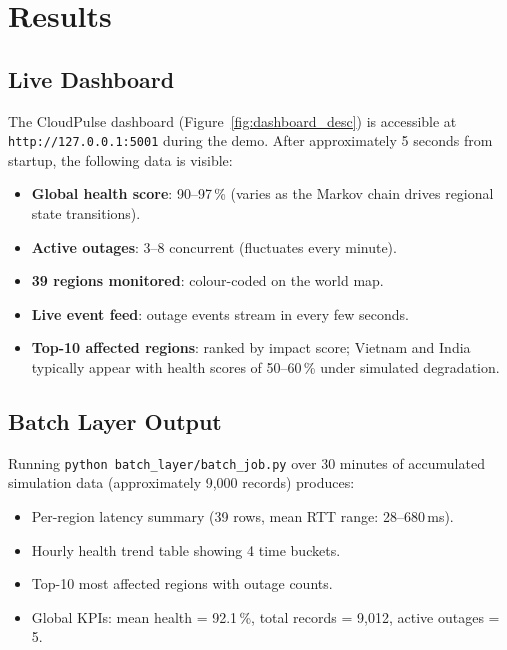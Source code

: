 \documentclass[conference]{IEEEtran}
\begin{document}
\section{Results}

\subsection{Live Dashboard}

The CloudPulse dashboard (Figure~\ref{fig:dashboard_desc}) is accessible at
\texttt{http://127.0.0.1:5001} during the demo. After approximately 5 seconds
from startup, the following data is visible:

\begin{itemize}
  \item \textbf{Global health score}: 90--97\,\% (varies as the Markov chain
    drives regional state transitions).
  \item \textbf{Active outages}: 3--8 concurrent (fluctuates every minute).
  \item \textbf{39 regions monitored}: colour-coded on the world map.
  \item \textbf{Live event feed}: outage events stream in every few seconds.
  \item \textbf{Top-10 affected regions}: ranked by impact score; Vietnam and
    India typically appear with health scores of 50--60\,\% under simulated
    degradation.
\end{itemize}

\subsection{Batch Layer Output}

Running \texttt{python batch\_layer/batch\_job.py} over 30 minutes of accumulated
simulation data (approximately 9{,}000 records) produces:
\begin{itemize}
  \item Per-region latency summary (39 rows, mean RTT range: 28--680\,ms).
  \item Hourly health trend table showing 4 time buckets.
  \item Top-10 most affected regions with outage counts.
  \item Global KPIs: mean health = 92.1\,\%, total records = 9{,}012,
    active outages = 5.
\end{itemize}
\end{document}
